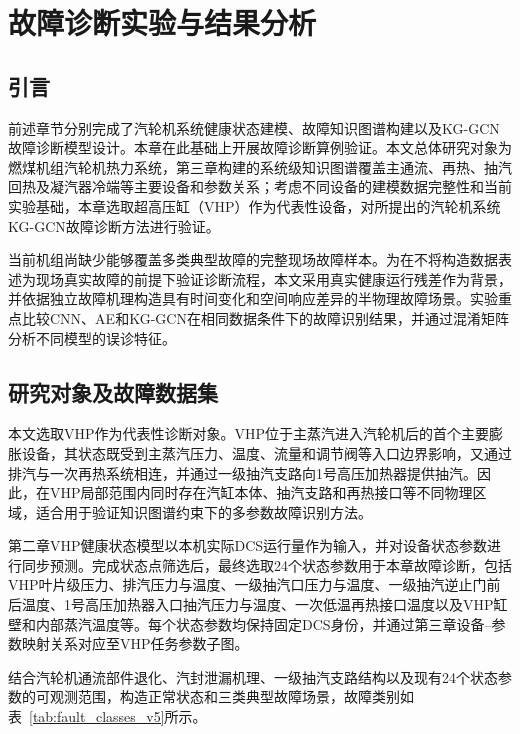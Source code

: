 \section{故障诊断实验与结果分析}
\label{sec:experiments_v5}

\subsection{引言}

前述章节分别完成了汽轮机系统健康状态建模、故障知识图谱构建以及KG-GCN故障诊断模型设计。本章在此基础上开展故障诊断算例验证。本文总体研究对象为燃煤机组汽轮机热力系统，第三章构建的系统级知识图谱覆盖主通流、再热、抽汽回热及凝汽器冷端等主要设备和参数关系；考虑不同设备的建模数据完整性和当前实验基础，本章选取超高压缸（VHP）作为代表性设备，对所提出的汽轮机系统KG-GCN故障诊断方法进行验证。

当前机组尚缺少能够覆盖多类典型故障的完整现场故障样本。为在不将构造数据表述为现场真实故障的前提下验证诊断流程，本文采用真实健康运行残差作为背景，并依据独立故障机理构造具有时间变化和空间响应差异的半物理故障场景。实验重点比较CNN、AE和KG-GCN在相同数据条件下的故障识别结果，并通过混淆矩阵分析不同模型的误诊特征。

\subsection{研究对象及故障数据集}
\label{subsec:fault_dataset_v5}

本文选取VHP作为代表性诊断对象。VHP位于主蒸汽进入汽轮机后的首个主要膨胀设备，其状态既受到主蒸汽压力、温度、流量和调节阀等入口边界影响，又通过排汽与一次再热系统相连，并通过一级抽汽支路向1号高压加热器提供抽汽。因此，在VHP局部范围内同时存在汽缸本体、抽汽支路和再热接口等不同物理区域，适合用于验证知识图谱约束下的多参数故障识别方法。

第二章VHP健康状态模型以本机实际DCS运行量作为输入，并对设备状态参数进行同步预测。完成状态点筛选后，最终选取24个状态参数用于本章故障诊断，包括VHP叶片级压力、排汽压力与温度、一级抽汽口压力与温度、一级抽汽逆止门前后温度、1号高压加热器入口抽汽压力与温度、一次低温再热接口温度以及VHP缸壁和内部蒸汽温度等。每个状态参数均保持固定DCS身份，并通过第三章设备--参数映射关系对应至VHP任务参数子图。

结合汽轮机通流部件退化、汽封泄漏机理、一级抽汽支路结构以及现有24个状态参数的可观测范围，构造正常状态和三类典型故障场景，故障类别如表~\ref{tab:fault_classes_v5}所示。

